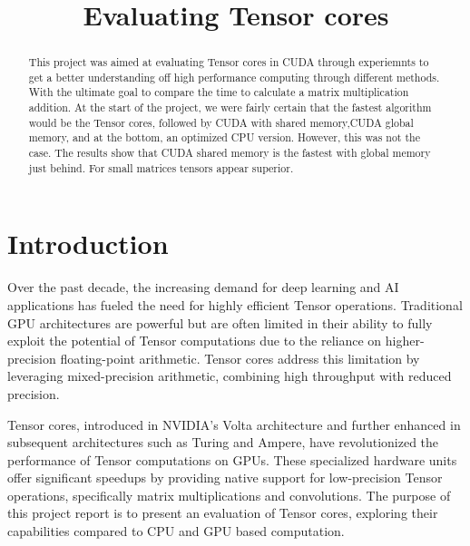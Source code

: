 \documentclass[conference]{IEEEtran}
\begin{document}
\title{Evaluating Tensor cores}


\author{
}

\maketitle

\begin{abstract}\label{sec:abstract}
This project was aimed at evaluating Tensor cores in CUDA through experiemnts to get a better understanding off
high performance computing through different methods. With the ultimate goal to compare the time to calculate a
matrix multiplication addition. At the start of the project, we were fairly certain that the fastest algorithm would be 
the Tensor cores, followed by CUDA with shared memory,CUDA global memory, and at the bottom, an optimized CPU version. However, this was not the case.
The results show that CUDA shared memory is the fastest with global memory just behind. For small matrices tensors appear superior.
\end{abstract}

\section{Introduction}\label{sec:intro}


Over the past decade, the increasing demand for deep learning and AI applications has
fueled the need for highly efficient Tensor operations. Traditional GPU architectures are powerful but 
are often limited in their ability to fully exploit the potential of 
Tensor computations due to the reliance on higher-precision floating-point arithmetic. 
Tensor cores address this limitation by leveraging mixed-precision arithmetic, combining 
high throughput with reduced precision.

Tensor cores, introduced in NVIDIA's Volta architecture and further enhanced in 
subsequent architectures such as Turing and Ampere, have revolutionized the performance of 
Tensor computations on GPUs. These specialized hardware units offer significant speedups 
by providing native support for low-precision Tensor operations, 
specifically matrix multiplications and convolutions. 
The purpose of this project report is to present an evaluation of Tensor cores,
exploring their capabilities compared to CPU and GPU based computation.
\end{document}
